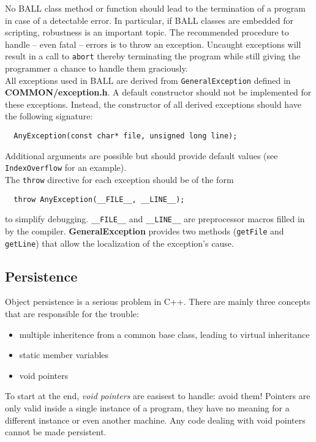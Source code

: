 \documentclass[a4paper,10pt]{article}
\begin{document}
No BALL class method or function should lead to the termination of a program
in case of a detectable error. In particular, if BALL classes are embedded 
for scripting, robustness is an important topic. The recommended
procedure to handle -- even fatal -- errors is to throw an exception. Uncaught
exceptions will result in a call to {\tt abort} thereby terminating the
program while still giving the programmer a chance to handle them graciously.\\
All exceptions used in BALL are derived from {\tt GeneralException}
defined in {\bf COMMON/exception.h}. A default constructor should not be
implemented for these exceptions. Instead, the constructor of all derived
exceptions should have the following signature:
\begin{verbatim}
  AnyException(const char* file, unsigned long line);
\end{verbatim}
Additional arguments are possible but should provide default values (see
{\tt IndexOverflow} for an example).\\
The {\tt throw} directive for each exception should be of the form
\begin{verbatim}
  throw AnyException(__FILE__, __LINE__);
\end{verbatim}
to simplify debugging. {\tt \_\_FILE\_\_} and {\tt \_\_LINE\_\_} are preprocessor
macros filled in by the compiler. {\bf GeneralException} provides two methods
({\tt getFile} and {\tt getLine}) that allow the localization of the
exception's cause.\\


\subsection{Persistence}

Object persistence is a serious problem in C++. There are mainly three
concepts that are responsible for the trouble:
\begin{itemize}
	\item multiple inheritence from a common base class, leading to virtual
		inheritance
	\item static member variables
	\item void pointers
\end{itemize}

To start at the end, {\em void pointers} are easisest to handle: avoid them!
Pointers are only valid inside a single instance of a program, they have no
meaning for a different instance or even another machine. Any code dealing
with void pointers cannot be made persistent.
\end{document}
